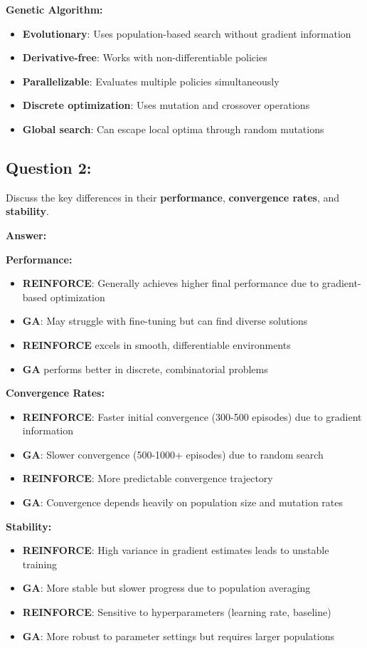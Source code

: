 \documentclass[12pt]{article}
\begin{document}
{{{\textbf{Genetic Algorithm:}
\begin{itemize}
    \item \textbf{Evolutionary}: Uses population-based search without gradient information
    \item \textbf{Derivative-free}: Works with non-differentiable policies
    \item \textbf{Parallelizable}: Evaluates multiple policies simultaneously
    \item \textbf{Discrete optimization}: Uses mutation and crossover operations
    \item \textbf{Global search}: Can escape local optima through random mutations
\end{itemize}

\subsection{Question 2:}
Discuss the key differences in their \textbf{performance}, \textbf{convergence rates}, and \textbf{stability}. 

\textbf{Answer:} 

\textbf{Performance:}
\begin{itemize}
    \item \textbf{REINFORCE}: Generally achieves higher final performance due to gradient-based optimization
    \item \textbf{GA}: May struggle with fine-tuning but can find diverse solutions
    \item \textbf{REINFORCE} excels in smooth, differentiable environments
    \item \textbf{GA} performs better in discrete, combinatorial problems
\end{itemize}

\textbf{Convergence Rates:}
\begin{itemize}
    \item \textbf{REINFORCE}: Faster initial convergence (300-500 episodes) due to gradient information
    \item \textbf{GA}: Slower convergence (500-1000+ episodes) due to random search
    \item \textbf{REINFORCE}: More predictable convergence trajectory
    \item \textbf{GA}: Convergence depends heavily on population size and mutation rates
\end{itemize}

\textbf{Stability:}
\begin{itemize}
    \item \textbf{REINFORCE}: High variance in gradient estimates leads to unstable training
    \item \textbf{GA}: More stable but slower progress due to population averaging
    \item \textbf{REINFORCE}: Sensitive to hyperparameters (learning rate, baseline)
    \item \textbf{GA}: More robust to parameter settings but requires larger populations
\end{itemize}

}}}
\end{document}
